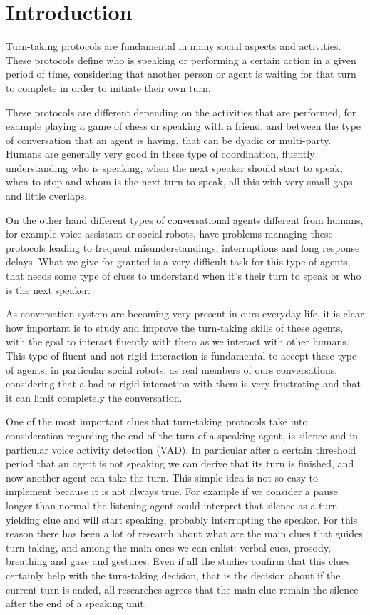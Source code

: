 \documentclass[../main.tex]{subfiles}
\begin{document}
\section{Introduction}
Turn-taking protocols are fundamental in many social aspects and activities. These protocols define who is speaking or performing a certain action in a given period of time, considering that another person or agent is waiting for that turn to complete in order to initiate their own turn. 

These protocols are different depending on the activities that are performed, for example playing a game of chess or speaking with a friend, and between the type of conversation that an agent is having, that can be dyadic or multi-party. Humans are generally very good in these type of coordination, fluently understanding who is speaking, when the next speaker should start to speak, when to stop and whom is the next turn to speak, all this with very small gaps and little overlaps. 

On the other hand different types of conversational agents different from humans, for example voice assistant or social robots, have problems managing these protocols leading to frequent misunderstandings, interruptions and long response delays. What we give for granted is a very difficult task for this type of agents, that needs some type of clues to understand when it's their turn to speak or who is the next speaker. 

As conversation system are becoming very present in ours everyday life, it is clear how important is to study and improve the turn-taking skills of these agents, with the goal to interact fluently with them as we interact with other humans. This type of fluent and not rigid interaction is fundamental to accept these type of agents, in particular social robots, as real members of ours conversations, considering that a bad or rigid interaction with them is very frustrating and that it can limit completely the conversation. 

One of the most important clues that turn-taking protocols take into consideration regarding the end of the turn of a speaking agent, is silence and in particular voice activity detection (VAD). In particular after a certain threshold period that an agent is not speaking we can derive that its turn is finished, and now another agent can take the turn. This simple idea is not so easy to implement because it is not always true. For example if we consider a pause longer than normal the listening agent could interpret that silence as a turn yielding clue and will start speaking, probably interrupting the speaker. For this reason there has been a lot of research about what are the main clues that guides turn-taking, and among the main ones we can enlist: verbal cues, prosody, breathing and gaze and gestures. Even if all the studies confirm that this clues certainly help with the turn-taking decision, that is the decision about if the current turn is ended, all researches agrees that the main clue remain the silence after the end of a speaking unit.
\end{document}
